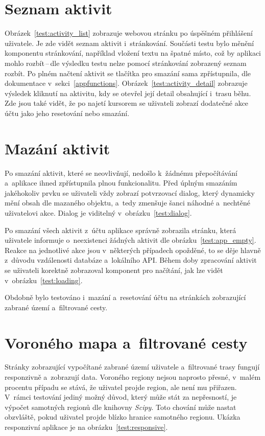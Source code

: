 \section{Seznam aktivit} 
Obrázek~\ref{test:activity_list} zobrazuje webovou stránku po úspěšném přihlášení uživatele. Je zde vidět seznam aktivit i~stránkování. Součásti testu bylo měnění komponentu stránkování, například vložení textu na špatné místo, což by aplikaci mohlo rozbít\,--\,dle výsledku testu nelze pomocí stránkování zobrazený seznam rozbít. Po plném načtení aktivit se tlačítka pro smazání sama zpřístupnila, dle dokumentace v~sekci~\ref{appfunctions}. Obrázek~\ref{test:activity_detail} zobrazuje výsledek kliknutí na aktivitu, kdy se otevřel její detail obsahující i~trasu běhu. Zde jsou také vidět, že po najetí kursorem se uživateli zobrazí dodatečné akce účtu jako jeho resetování nebo smazání.

\section{Mazání aktivit}
Po smazání aktivit, které se neovlivňují, nedošlo k~žádnému přepočítávání a~aplikace ihned zpřístupnila plnou funkcionalitu. Před úplným smazáním jakéhokoliv prvku se uživateli vždy zobrazí potvrzovací dialog, který dynamicky mění obsah dle mazaného objektu, a~tedy zmenšuje šanci náhodné a~nechtěné uživatelovi akce. Dialog je viditelný v~obrázku~\ref{test:dialog}.

Po smazání všech aktivit z~účtu aplikace správně zobrazila stránku, která uživatele informuje o~neexistenci žádných aktivit dle obrázku~\ref{test:app_empty}. Reakce na jednotlivé akce jsou v~některých případech opožděné, to se děje hlavně z~důvodu vzdálenosti databáze a~lokálního API. Během doby zpracování aktivit se uživateli korektně zobrazoval komponent pro načítání, jak lze vidět v~obrázku~\ref{test:loading}. 

Obdobně bylo testováno i~mazání a~resetování účtu na stránkách zobrazující zabrané území a~filtrované cesty.

\section{Voroného mapa a~filtrované cesty}
Stránky zobrazující vypočítané zabrané území uživatele a~filtrované trasy fungují responzivně a~zobrazují data. Voroného regiony nejsou naprosto přesné, v~malém procentu případu se stává, že uživatel projde region, ale není mu přiřazen. V~rámci testování jediný možný důvod, který může stát za nepřesností, je výpočet samotných regionů dle knihovny \emph{Scipy}. Toto chování může nastat obzvláště, pokud uživatel projde blízko hranice samotného regionu. Ukázka responzivní aplikace je na obrázku~\ref{test:responsive}. 


